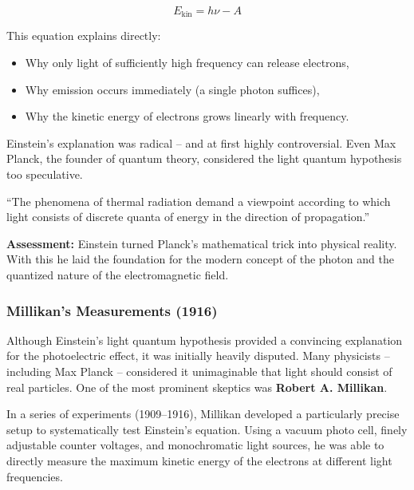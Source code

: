 \[
E_{\text{kin}} = h \nu - A
\]

This equation explains directly:
\begin{itemize}
	\item Why only light of sufficiently high frequency can release electrons,
	\item Why emission occurs immediately (a single photon suffices),
	\item Why the kinetic energy of electrons grows linearly with frequency.
\end{itemize}

Einstein’s explanation was radical – and at first highly controversial. Even Max Planck, the founder of quantum theory, considered the light quantum hypothesis too speculative.

\vspace{1em}
\begin{tcolorbox}[physikbox, title=Albert Einstein (1905)\textit{ \cite{einstein1905}}]
	\label{die Erscheinung der Wärm}
	\small
	“The phenomena of thermal radiation demand a viewpoint according to which light consists of discrete quanta of energy in the direction of propagation.”
\end{tcolorbox}
\vspace{1em}
\textbf{Assessment:} Einstein turned Planck’s mathematical trick into physical reality. With this he laid the foundation for the modern concept of the photon and the quantized nature of the electromagnetic field.

\subsubsection{Millikan’s Measurements (1916)}

Although Einstein’s light quantum hypothesis provided a convincing explanation for the photoelectric effect, it was initially heavily disputed. Many physicists – including Max Planck – considered it unimaginable that light should consist of real particles. One of the most prominent skeptics was \textbf{Robert A. Millikan}.

In a series of experiments (1909–1916), Millikan developed a particularly precise setup to systematically test Einstein’s equation. Using a vacuum photo cell, finely adjustable counter voltages, and monochromatic light sources, he was able to directly measure the maximum kinetic energy of the electrons at different light frequencies.

